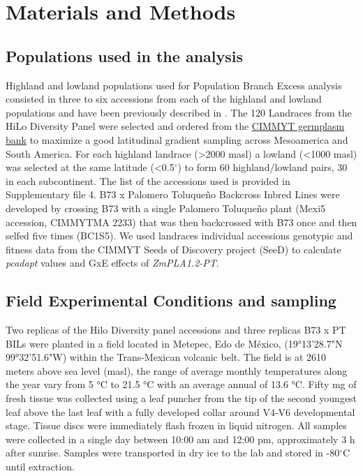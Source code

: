 \documentclass[9pt,twocolumn,twoside]{BioRxiv}
\begin{document}
\section{Materials and Methods}
\label{sec:materials:methods}
\subsection{Populations used in the analysis } 
Highland and lowland populations used for Population Branch Excess analysis consisted in three to six accessions from each of the highland and lowland populations and have been previously described in \cite{Wang2020-mp, Wang2017-bc}. 
The 120 Landraces from the HiLo Diversity Panel were selected and ordered from the \href{http://mgb.cimmyt.org/gringlobal/search.aspx}{CIMMYT germplasm bank} to maximize a good latitudinal gradient sampling across Mesoamerica and South America. For each highland landrace (>2000 masl) a lowland (<1000 masl) was selected at the same latitude (<0.5$^{\circ}$) to form 60 highland/lowland pairs, 30 in each subcontinent. 
The list of the accessions used is provided in Supplementary file 4.   
B73 x Palomero Toluqueño Backcross Inbred Lines were developed by crossing B73 with a single Palomero Toluqueño plant (Mexi5 accession, CIMMYTMA 2233) that was then backcrossed with B73 once and then selfed five times (BC1S5).  
We used landraces individual accessions genotypic and fitness data from the CIMMYT Seeds of Discovery project (SeeD) \cite{Gates2019-xu} to calculate \textit{pcadapt} \cite{Luu2017-ws} values and GxE effects of \textit{ZmPLA1.2-PT}.
\subsection{Field Experimental Conditions and sampling} 
Two replicas of the Hilo Diversity panel accessions and three replicas B73 x PT BILs were planted in a field located in Metepec, Edo de México, (19°13'28.7"N 99°32'51.6"W) within the Trans-Mexican volcanic belt. 
The field is at 2610 meters above sea level (masl), the range of average monthly temperatures along the year vary from 5 °C to 21.5 °C with an average annual of 13.6 °C.  
Fifty mg of fresh tissue was collected using a leaf puncher from the tip of the second youngest leaf above the last leaf with a fully developed collar around V4-V6 developmental stage. 
Tissue discs were immediately flash frozen in liquid nitrogen. 
All samples were collected in a single day between 10:00 am and 12:00 pm, approximately 3 h after sunrise. 
Samples were transported in dry ice to the lab and stored in -80$^{\circ}$C until extraction. 
\end{document}
